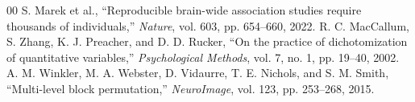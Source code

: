 \documentclass[conference]{IEEEtran}
\begin{document}
\begin{thebibliography}{00}
 S. Marek et al., ``Reproducible brain-wide association studies require thousands of individuals,'' \textit{Nature}, vol. 603, pp. 654--660, 2022.
 R. C. MacCallum, S. Zhang, K. J. Preacher, and D. D. Rucker, ``On the practice of dichotomization of quantitative variables,'' \textit{Psychological Methods}, vol. 7, no. 1, pp. 19--40, 2002.
 A. M. Winkler, M. A. Webster, D. Vidaurre, T. E. Nichols, and S. M. Smith, ``Multi-level block permutation,'' \textit{NeuroImage}, vol. 123, pp. 253--268, 2015.
\end{thebibliography}
\end{document}
